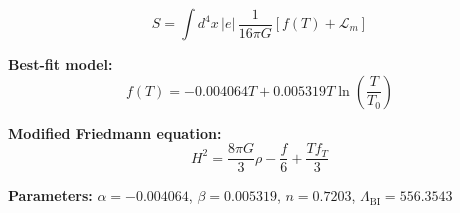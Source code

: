 
\begin{equation}
  S = \int d^4x \, |e| \, \frac{1}{16\pi G} \left[ f(T) + \mathcal{L}_m \right]
\end{equation}

\textbf{Best-fit model:}
\begin{equation}
  f(T) = -0.004064 T + 0.005319 T \ln\!\left(\frac{T}{T_0}\right)
\end{equation}

\textbf{Modified Friedmann equation:}
\begin{equation}
  H^2 = \frac{8\pi G}{3} \rho - \frac{f}{6} + \frac{T f_T}{3}
\end{equation}

\textbf{Parameters:}
$\alpha = -0.004064$, \quad
$\beta = 0.005319$, \quad
$n = 0.7203$, \quad
$\Lambda_{\text{BI}} = 556.3543$